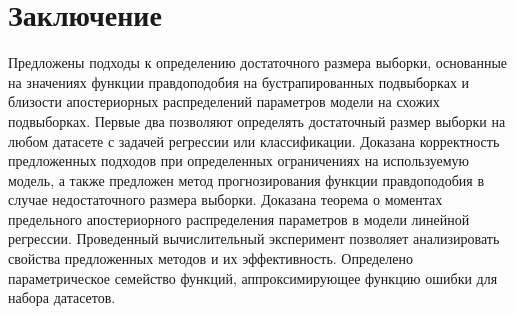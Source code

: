 \section*{Заключение}                         %

Предложены подходы к определению достаточного размера выборки, основанные на значениях функции правдоподобия на бустрапированных подвыборках и близости апостериорных распределений параметров модели на схожих подвыборках. Первые два позволяют определять достаточный размер выборки на любом датасете с задачей регрессии или классификации. Доказана корректность предложенных подходов при определенных ограничениях на используемую модель, а также предложен метод прогнозирования функции правдоподобия в случае недостаточного размера выборки. Доказана теорема о моментах предельного апостериорного распределения параметров в модели линейной регрессии. Проведенный вычислительный эксперимент позволяет анализировать свойства предложенных методов и их эффективность. Определено параметрическое семейство функций, аппроксимирующее функцию ошибки для набора датасетов. 